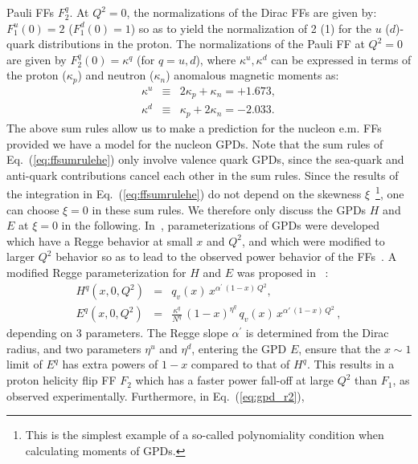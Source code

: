 Pauli FFs \( F_{2}^{q} \).
At $Q^2 = 0$, the normalizations of the Dirac FFs are given by:
$F_{1}^{u}(0) = 2$ ($F_{1}^{d}(0) = 1$) 
so as to yield the normalization of 2 (1) for the
$u$ ($d$)-quark distributions in the proton. 
The normalizations of the Pauli FF at $Q^2 = 0$ are 
given by $F_{2}^{q}(0) = \kappa^q$ (for $q = u, d$), where 
$\kappa^u, \kappa^d$ can be expressed 
in terms of the proton ($\kappa_p$) 
and neutron ($\kappa_n$) anomalous magnetic moments as:
\begin{eqnarray}
\kappa^u &\equiv & 2 \kappa_p + \kappa_n = +1.673, 
			\nonumber\\
\kappa^d&\equiv & \kappa_p + 2 \kappa_n = -2.033. 
\label{eq:kappaud}
\end{eqnarray}
\indent
The above sum rules allow us to make a prediction for the 
nucleon e.m. FFs provided we have a model for the nucleon GPDs. 
Note that the sum rules of Eq.~(\ref{eq:ffsumrulehe}) only involve valence 
quark GPDs, since the sea-quark and anti-quark contributions 
cancel each other in the sum rules. 
Since the results of the integration 
in Eq.~(\ref{eq:ffsumrulehe}) do not depend on the skewness 
$\xi$~\footnote{This is the simplest example
of a so-called polynomiality condition when calculating moments of GPDs.}, one 
can choose $\xi = 0$ in these sum rules. We therefore only discuss 
the GPDs $H$ and $E$ at $\xi = 0$ in the following. 
\newline
\indent 
In~\cite{diehl,guidal}, parameterizations of GPDs were developed 
which have a Regge behavior at small $x$ and $Q^2$, and which were 
modified to larger $Q^2$ behavior so as to lead to the observed power 
behavior of the FFs~\cite{Burkardt:2002hr,Burkardt:2004bv}. 
A modified Regge parameterization for $H$ and $E$ was proposed in 
\cite{guidal}~:
\begin{eqnarray}
H^q (x,0,Q^2) &=& q_v (x)\,  x^{\alpha^\prime \, (1 - x) \, Q^2}, 
			\nonumber\\
E^q (x, 0, Q^2) &=& \frac{\kappa^q}{N^q} 
\, (1 - x)^{\eta^q} \, q_v(x) \, 
{{x^{\alpha' \, (1 - x) \, Q^2}}} \, , 
\label{eq:gpd_r2}
\end{eqnarray}
depending on 3 parameters.  
The Regge slope $\alpha^\prime$ is determined from the Dirac radius, 
and two parameters $\eta^u$ and $\eta^d$, entering the GPD $E$, ensure that 
the $x\sim 1 $ limit of $E^q$ 
has extra powers of $1-x$ compared to that  of $H^q$. 
This results in a proton helicity flip FF $F_2$ which has a faster 
power fall-off at large $Q^2$ than $F_1$, as observed experimentally.   
Furthermore, in Eq.~(\ref{eq:gpd_r2}), 
